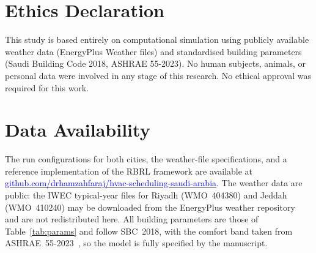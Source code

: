 \documentclass[3p,number]{elsarticle}
\let\oldsection\section
\renewcommand{\section}{\FloatBarrier\oldsection}
\begin{document}
\section {Ethics Declaration}
This study is based entirely on computational simulation using publicly available weather data (EnergyPlus Weather files) and standardised building parameters (Saudi Building Code 2018, ASHRAE 55-2023).
No human subjects, animals, or personal data were involved in any stage of this research.
No ethical approval was required for this work.
\section {Data Availability}
The run configurations for both cities, the weather-file specifications, and a reference implementation of the RBRL framework are available at \href{https://github.com/drhamzahfaraj/hvac-scheduling-saudi-arabia}{\textcolor{blue}{github.com/drhamzahfaraj/hvac-scheduling-saudi-arabia}}.
The weather data are public: the IWEC typical-year files for Riyadh (WMO~404380) and Jeddah (WMO~410240) may be downloaded from the EnergyPlus weather repository~\cite{EPW2023} and are not redistributed here.
All building parameters are those of Table~\ref{tab:params} and follow SBC~2018, with the comfort band taken from ASHRAE~55-2023~\cite{ASHRAE55_2023}, so the model is fully specified by the manuscript.



\end{document}
